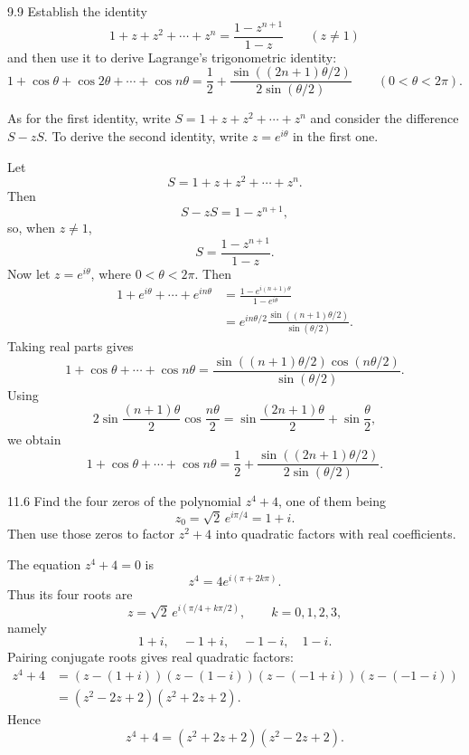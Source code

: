 \documentclass[11pt,oneside]{article}
\begin{document}
\begin{exercise}{9.9}
Establish the identity
\[
    1+z+z^2+\cdots+z^n=\frac{1-z^{n+1}}{1-z}
    \qquad(z\ne1)
\]
and then use it to derive Lagrange's trigonometric identity:
\[
    1+\cos\theta+\cos2\theta+\cdots+\cos n\theta
    =\frac12+\frac{\sin((2n+1)\theta/2)}{2\sin(\theta/2)}
    \qquad(0<\theta<2\pi).
\]
\begin{suggestion}
As for the first identity, write \(S=1+z+z^2+\cdots+z^n\) and consider the difference \(S-zS\). To derive the second identity, write \(z=e^{i\theta}\) in the first one.
\end{suggestion}
\end{exercise}

\begin{solution}
Let
\[
    S=1+z+z^2+\cdots+z^n.
\]
Then
\[
    S-zS=1-z^{n+1},
\]
so, when \(z\ne1\),
\[
    \boxed{S=\frac{1-z^{n+1}}{1-z}}.
\]
Now let \(z=e^{i\theta}\), where \(0<\theta<2\pi\). Then
\[
\begin{aligned}
    1+e^{i\theta}+\cdots+e^{in\theta}
    &=\frac{1-e^{i(n+1)\theta}}{1-e^{i\theta}}\\
    &=e^{in\theta/2}
      \frac{\sin((n+1)\theta/2)}{\sin(\theta/2)}.
\end{aligned}
\]
Taking real parts gives
\[
    1+\cos\theta+\cdots+\cos n\theta
    =\frac{\sin((n+1)\theta/2)\cos(n\theta/2)}{\sin(\theta/2)}.
\]
Using
\[
    2\sin\frac{(n+1)\theta}{2}\cos\frac{n\theta}{2}
    =\sin\frac{(2n+1)\theta}{2}+\sin\frac\theta2,
\]
we obtain
\[
    \boxed{
    1+\cos\theta+\cdots+\cos n\theta
    =\frac12+\frac{\sin((2n+1)\theta/2)}{2\sin(\theta/2)}
    }.
\]
\end{solution}

\begin{exercise}{11.6}
Find the four zeros of the polynomial \(z^4+4\), one of them being
\[
    z_0=\sqrt2\,e^{i\pi/4}=1+i.
\]
Then use those zeros to factor \(z^2+4\) into quadratic factors with real coefficients.
\end{exercise}

\begin{solution}
The equation \(z^4+4=0\) is
\[
    z^4=4e^{i(\pi+2k\pi)}.
\]
Thus its four roots are
\[
    z=\sqrt2\,e^{i(\pi/4+k\pi/2)},
    \qquad k=0, 1, 2, 3,
\]
namely
\[
    1+i, \quad -1+i, \quad -1-i, \quad 1-i.
\]
Pairing conjugate roots gives real quadratic factors:
\[
\begin{aligned}
    z^4+4
    &=(z-(1+i))(z-(1-i))(z-(-1+i))(z-(-1-i))\\
    &=(z^2-2z+2)(z^2+2z+2).
\end{aligned}
\]
Hence
\[
    \boxed{z^4+4=(z^2+2z+2)(z^2-2z+2)}.
\]
\end{solution}
\end{document}
